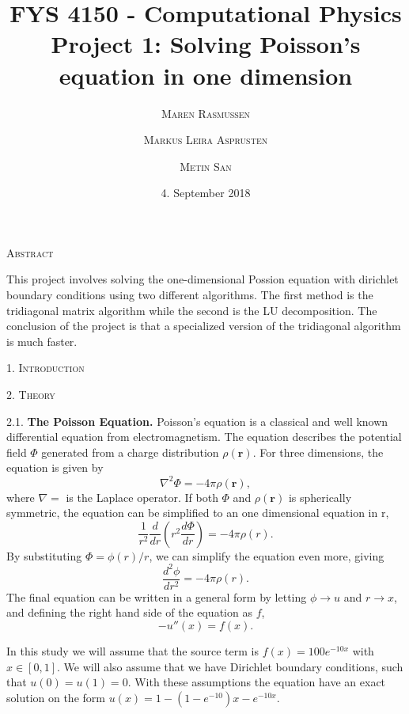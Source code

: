 \documentclass[a4paper,10pt,]{article}
\title{ \textbf{FYS 4150 - Computational Physics\\
 Project 1: Solving Poisson's equation in one dimension 
}}
\date{\normalsize{4. September 2018} }
\author{
 \textsc{\small{Maren Rasmussen}}\and \textsc{\small{Markus Leira Asprusten}}\and \textsc{\small{Metin San}}
 }
\newcommand{\der}[2]{\frac{d #1}{d #2}}
\newcommand{\dder}[2]{\frac{d^2 #1}{d #2 ^2}}
\begin{document}
\maketitle

\begin{center}
\textsc{Abstract}
\end{center}

\begin{adjustwidth}{7mm}{7mm}

This project involves solving the one-dimensional Possion equation with dirichlet boundary conditions using two different algorithms. The first method is the tridiagonal matrix algorithm while the second is the LU decomposition. The conclusion of the project is that a specialized version of the tridiagonal algorithm is much faster.

\end{adjustwidth}



\bigskip

\begin{center}
\textsc{1. Introduction}
\end{center}

\blindtext

\newpage


\begin{center}
\textsc{2. Theory}
\end{center}
2.1. \textbf{The Poisson Equation.} 
Poisson's equation is a classical and well known differential equation from electromagnetism. The equation describes the potential field $\Phi$ generated from a charge distribution $\rho(\textbf{r})$. For three dimensions, the equation is given by
 $$ \nabla^2 \Phi = -4 \pi \rho(\textbf{r}), $$
where $\nabla = $ is the Laplace operator. If both $\Phi$ and $\rho(\textbf{r})$ is spherically symmetric, the equation can be simplified to an one dimensional equation in r,
$$ \frac{1}{r^2}  \der{}{r} \left( r^2 \der{\Phi}{r} \right)= -4 \pi \rho(r).$$
By substituting $\Phi = \phi(r)/r$, we can simplify the equation even more, giving 
$$ \dder{\phi}{r} = -4\pi \rho(r). $$ 
The final equation can be written in a general form by letting $\phi \rightarrow u$ and $r \rightarrow x$, and defining the right hand side of the equation as $f$,
$$- u''(x) = f(x). $$ 

In this study we will assume that the source term is $f(x) = 100 e^{-10x}$ with $x \in [0,1]$. We will also assume that we have Dirichlet boundary conditions, such that $ u(0) = u(1) = 0. $ With these assumptions the equation have an exact solution on the form $u(x) = 1 - (1 - e^{-10})x - e^{-10x}$. \\
\end{document}
